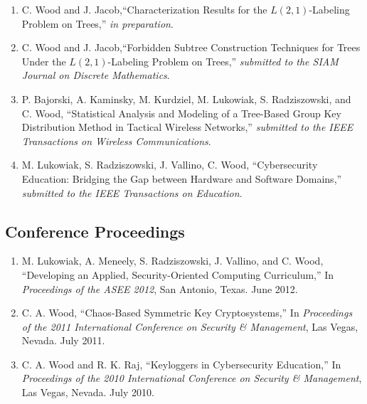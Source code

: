 \documentclass[letterpaper,11pt]{article}
\begin{document}
\begin{enumerate}[J-1.]

\item 
	C. Wood and J. Jacob,``Characterization Results for the $L(2,1)$-Labeling Problem on Trees,'' {\it in preparation}.

\item
	C. Wood and J. Jacob,``Forbidden Subtree Construction Techniques for Trees Under the $L(2,1)$-Labeling Problem on Trees,'' {\it submitted to the SIAM Journal on Discrete Mathematics}.

\item
	P. Bajorski, A. Kaminsky, M. Kurdziel, M. Lukowiak, S. Radziszowski, and C. Wood, ``Statistical Analysis and Modeling of a Tree-Based Group Key Distribution Method in Tactical Wireless Networks,'' {\it submitted to the IEEE Transactions on Wireless Communications}.

\item
	M. Lukowiak, S. Radziszowski, J. Vallino, C. Wood, ``Cybersecurity Education: Bridging the Gap between Hardware and Software Domains,'' {\it submitted to the IEEE Transactions on Education}.
\end{enumerate}

\subsection*{Conference Proceedings}
\begin{enumerate}[C-1.]
\item 
	M. Lukowiak, A. Meneely, S. Radziszowski, J. Vallino, and C. Wood, ``Developing an Applied, Security-Oriented Computing Curriculum,'' In {\it Proceedings of the ASEE 2012}, San Antonio, Texas. June 2012.

\item
	C. A. Wood, ``Chaos-Based Symmetric Key Cryptosystems,'' In {\it Proceedings of the 2011 International Conference on Security \& Management}, Las Vegas, Nevada. July 2011.

\item 
	C. A. Wood and R. K. Raj, ``Keyloggers in Cybersecurity Education,'' In {\it Proceedings of the 2010 International Conference on Security \& Management}, Las Vegas, Nevada. July 2010.

\end{enumerate}
\end{document}
